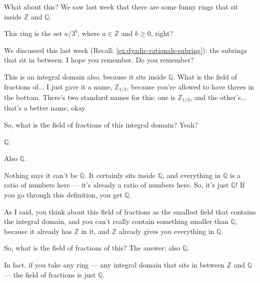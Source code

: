 \begin{speech}[01:11:22 - 01:12:32]
What about this? We saw last week that there are some funny rings that sit inside $\mathbb{Z}$ and $\mathbb{Q}$. 

This ring is the set $a / 3^b$, where $a \in \mathbb{Z}$ and $b \ge 0$, right? 

We discussed this last week (Recall: \cref{ex:dyadic-rationals-subring}): the subrings that sit in between. I hope you remember. Do you remember?

This is an integral domain also,  because it sits inside $\mathbb{Q}$. What is the field of fractions of...  I just gave it a name, $\mathbb{Z}_{1/3}$, because you're allowed to have threes in the bottom. There's two standard names for this: one is $\mathbb{Z}_{1/3}$, and the other's... that's a better name, okay.

So, what is the field of fractions of this integral domain? Yeah?
\end{speech}

\begin{student}
$\mathbb{Q}$.
\end{student}

\begin{speech}[01:12:33 - 01:13:22]
Also $\mathbb{Q}$. 

Nothing says it can't be $\mathbb{Q}$. It certainly sits inside $\mathbb{Q}$, and everything in $\mathbb{Q}$ is a ratio of numbers here --- it's already a ratio of numbers here. So, it's just $\mathbb{Q}$! If you go through this definition, you get $\mathbb{Q}$.

As I said, you think about this field of fractions as the smallest field that contains the integral domain, and you can't really contain something smaller than $\mathbb{Q}$, because it already has $\mathbb{Z}$ in it, and $\mathbb{Z}$ already gives you everything in $\mathbb{Q}$.

So, what is the field of fractions of this? The answer: also $\mathbb{Q}$.

In fact, if you take any ring --- any integral domain that sits in between $\mathbb{Z}$ and $\mathbb{Q}$ --- the field of fractions is just $\mathbb{Q}$.
\end{speech}

